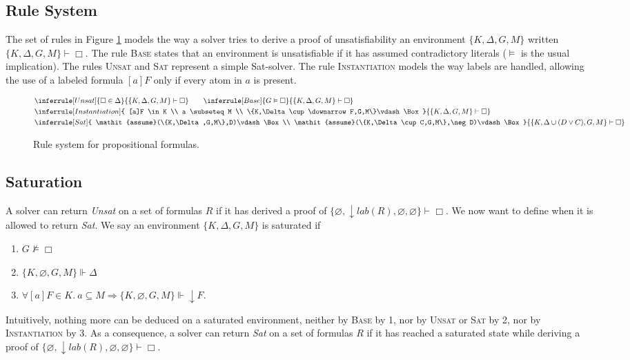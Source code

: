 \documentclass[a4paper,11pt]{article}
\newcommand{\T}{\mathit{lab}}
\newcommand{\A}{\mathit{assume}}
\begin{document}
\subsection{Rule System}
The set of rules in Figure \ref{p-sr} models the way a solver tries to derive a proof of unsatisfiability
an environment $\{K,\Delta,G,M\}$ written $\{K,\Delta,G,M\}\vdash\Box$. The rule \textsc{Base} states that
an environment is unsatisfiable if it has assumed contradictory literals ($\vDash$ is the usual
implication). The rules \textsc{Unsat} and
\textsc{Sat} represent a simple Sat-solver. The rule \textsc{Instantiation} models the way labels
are handled, allowing the use of a labeled formula $[a]F$ only if every atom in $a$ is present.

\begin{figure}
\begin{eqnarray*}
&
\inferrule [Unsat]{
\Box\in \Delta
}{
\{K,\Delta,G,M\}\vdash\Box
}\qquad
\inferrule [Base]{
G\vDash\Box
}{
\{K,\Delta,G,M\}\vdash\Box
}\\
&
\inferrule [Instantiation]{
[a]F \in K  \\ a \subseteq M \\ \{K,\Delta\cup\downarrow F,G,M\}\vdash\Box
}{
\{K,\Delta,G,M\}\vdash\Box
}\\
&
\inferrule [Sat]{
\A(\{K,\Delta,G,M\},D)\vdash\Box\\ \A(\{K,\Delta\cup C,G,M\},\neg D)\vdash\Box
}{
\{K,\Delta\cup(D\vee C),G,M\}\vdash\Box
}
\end{eqnarray*}
\caption{\label{p-sr} Rule system for propositional formulas.}
\end{figure}

\subsection{Saturation}
A solver can return \emph{Unsat} on a set of formulas $R$ if it has derived a proof of
$\{\varnothing,\downarrow\T(R),\varnothing,\varnothing\}\vdash\Box$. We now want to define when
it is allowed to return \emph{Sat}. We say an environment $\{K,\Delta,G,M\}$ is saturated if
\begin{enumerate}
 \item $G\nvDash\Box$
 \item $\{K,\varnothing,G,M\}\Vdash\Delta$
 \item $\forall [a]F\in K.\ a\subseteq M\Rightarrow \{K,\varnothing,G,M\}\Vdash\downarrow F$.
\end{enumerate}
Intuitively, nothing more can be deduced on a saturated environment, neither by \textsc{Base}
by 1, nor by \textsc{Unsat} or \textsc{Sat} by 2, nor by \textsc{Instantiation} by 3.
As a consequence, a solver can return \emph{Sat} on a set of formulas $R$ if it has reached
a saturated state while deriving a proof of
$\{\varnothing,\downarrow\T(R),\varnothing,\varnothing\}\vdash\Box$.
\end{document}
